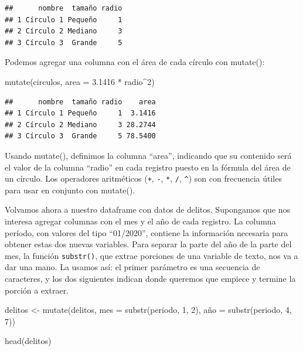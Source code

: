 \documentclass[
]{book}
\newenvironment{Shaded}{\begin{snugshade}}{\end{snugshade}}
\newcommand{\AttributeTok}[1]{\textcolor[rgb]{0.77,0.63,0.00}{#1}}
\newcommand{\DecValTok}[1]{\textcolor[rgb]{0.00,0.00,0.81}{#1}}
\newcommand{\FloatTok}[1]{\textcolor[rgb]{0.00,0.00,0.81}{#1}}
\newcommand{\FunctionTok}[1]{\textcolor[rgb]{0.00,0.00,0.00}{#1}}
\newcommand{\NormalTok}[1]{#1}
\newcommand{\OtherTok}[1]{\textcolor[rgb]{0.56,0.35,0.01}{#1}}
\newcommand{\SpecialCharTok}[1]{\textcolor[rgb]{0.00,0.00,0.00}{#1}}
\begin{document}
\begin{verbatim}
##      nombre  tamaño radio
## 1 Círculo 1 Pequeño     1
## 2 Círculo 2 Mediano     3
## 3 Círculo 3  Grande     5
\end{verbatim}

Podemos agregar una columna con el área de cada círculo con mutate():

\begin{Shaded}
\begin{Highlighting}[]
\FunctionTok{mutate}\NormalTok{(circulos, }\AttributeTok{area =} \FloatTok{3.1416} \SpecialCharTok{*}\NormalTok{ radio}\SpecialCharTok{\^{}}\DecValTok{2}\NormalTok{)}
\end{Highlighting}
\end{Shaded}

\begin{verbatim}
##      nombre  tamaño radio    area
## 1 Círculo 1 Pequeño     1  3.1416
## 2 Círculo 2 Mediano     3 28.2744
## 3 Círculo 3  Grande     5 78.5400
\end{verbatim}

Usando mutate(), definimos la columna ``area'', indicando que su contenido será el valor de la columna ``radio'' en cada registro puesto en la fórmula del área de un círculo. Los operadores aritméticos (\texttt{+}, \texttt{-}, \texttt{*}, \texttt{/}, \texttt{\^{}}) son con frecuencia útiles para usar en conjunto con mutate().

Volvamos ahora a nuestro dataframe con datos de delitos. Supongamos que nos interesa agregar columnas con el mes y el año de cada registro. La columna período, con valores del tipo ``01/2020'', contiene la información necesaria para obtener estas dos nuevas variables. Para separar la parte del año de la parte del mes, la función \texttt{substr()}, que extrae porciones de una variable de texto, nos va a dar una mano. La usamos así: el primer parámetro es una secuencia de caracteres, y los dos siguientes indican donde queremos que empiece y termine la porción a extraer.

\begin{Shaded}
\begin{Highlighting}[]
\NormalTok{delitos }\OtherTok{\textless{}{-}} \FunctionTok{mutate}\NormalTok{(delitos,}
                  \AttributeTok{mes =} \FunctionTok{substr}\NormalTok{(periodo, }\DecValTok{1}\NormalTok{, }\DecValTok{2}\NormalTok{),}
\NormalTok{                  año }\OtherTok{=} \FunctionTok{substr}\NormalTok{(periodo, }\DecValTok{4}\NormalTok{, }\DecValTok{7}\NormalTok{))}
                                
\FunctionTok{head}\NormalTok{(delitos) }
\end{Highlighting}
\end{Shaded}
\end{document}
